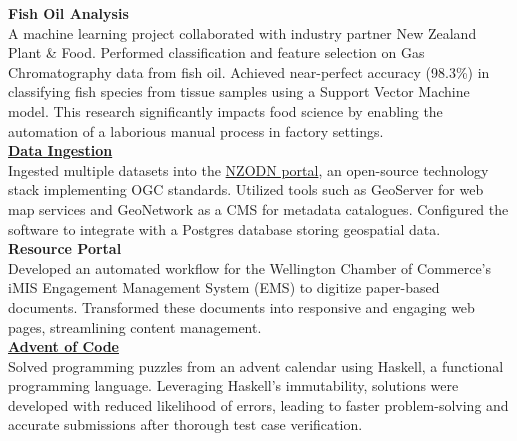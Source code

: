 \documentclass[9pt]{developercv}
\begin{document}


\textbf{Fish Oil Analysis} \\
A machine learning project collaborated with industry partner New Zealand Plant \& Food. Performed classification and feature selection on Gas Chromatography data from fish oil. Achieved near-perfect accuracy (98.3\%) in classifying fish species from tissue samples using a Support Vector Machine model. This research significantly impacts food science by enabling the automation of a laborious manual process in factory settings. \\

\textbf{\href{https://github.com/woodRock/psychic-invention}{Data Ingestion}} \\
Ingested multiple datasets into the \href{https://nzodn.nz/}{NZODN portal}, an open-source technology stack implementing OGC standards. Utilized tools such as GeoServer for web map services and GeoNetwork as a CMS for metadata catalogues. Configured the software to integrate with a Postgres database storing geospatial data. \\

\textbf{Resource Portal} \\
Developed an automated workflow for the Wellington Chamber of Commerce's iMIS Engagement Management System (EMS) to digitize paper-based documents. Transformed these documents into responsive and engaging web pages, streamlining content management. \\

\textbf{\href{https://github.com/woodRock/verbose-computing-machine}{Advent of Code}} \\
Solved programming puzzles from an advent calendar using Haskell, a functional programming language. Leveraging Haskell's immutability, solutions were developed with reduced likelihood of errors, leading to faster problem-solving and accurate submissions after thorough test case verification. \\

\end{document}
